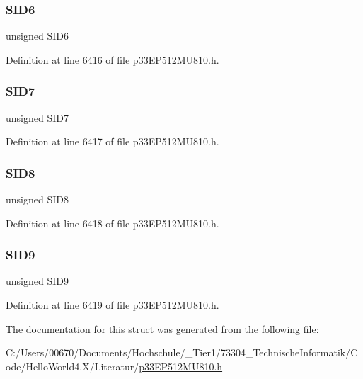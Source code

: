 \subsubsection{\texorpdfstring{S\+I\+D6}{SID6}}
{\footnotesize\ttfamily unsigned S\+I\+D6}



Definition at line 6416 of file p33\+E\+P512\+M\+U810.\+h.

\mbox{\label{structtag_c2_r_x_f4_s_i_d_b_i_t_s_a34097fb76decd431701fa2d86a22328e}} 
\subsubsection{\texorpdfstring{S\+I\+D7}{SID7}}
{\footnotesize\ttfamily unsigned S\+I\+D7}



Definition at line 6417 of file p33\+E\+P512\+M\+U810.\+h.

\mbox{\label{structtag_c2_r_x_f4_s_i_d_b_i_t_s_afe74894633244fdb0b0c01b4e8c522e7}} 
\subsubsection{\texorpdfstring{S\+I\+D8}{SID8}}
{\footnotesize\ttfamily unsigned S\+I\+D8}



Definition at line 6418 of file p33\+E\+P512\+M\+U810.\+h.

\mbox{\label{structtag_c2_r_x_f4_s_i_d_b_i_t_s_a33587704948067005c2a6a3ccc503c99}} 
\subsubsection{\texorpdfstring{S\+I\+D9}{SID9}}
{\footnotesize\ttfamily unsigned S\+I\+D9}



Definition at line 6419 of file p33\+E\+P512\+M\+U810.\+h.



The documentation for this struct was generated from the following file\+:\begin{DoxyCompactItemize}
\item 
C\+:/\+Users/00670/\+Documents/\+Hochschule/\+\_\+\+Tier1/73304\+\_\+\+Technische\+Informatik/\+Code/\+Hello\+World4.\+X/\+Literatur/\hyperlink{p33_e_p512_m_u810_8h}{p33\+E\+P512\+M\+U810.\+h}\end{DoxyCompactItemize}
